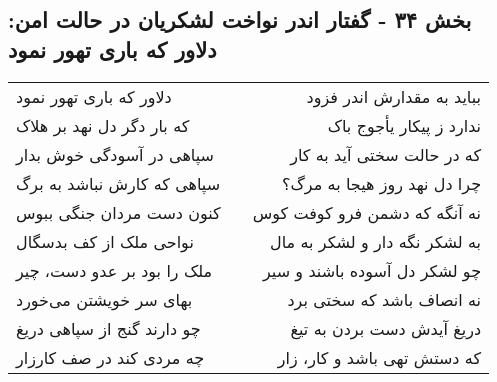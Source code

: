 \begin{center}
\section*{بخش ۳۴ - گفتار اندر نواخت لشکریان در حالت امن: دلاور که باری تهور نمود}
\label{sec:034}
\begin{longtable}{l p{0.5cm} r}
دلاور که باری تهور نمود
&&
بباید به مقدارش اندر فزود
\\
که بار دگر دل نهد بر هلاک
&&
ندارد ز پیکار یأجوج باک
\\
سپاهی در آسودگی خوش بدار
&&
که در حالت سختی آید به کار
\\
سپاهی که کارش نباشد به برگ
&&
چرا دل نهد روز هیجا به مرگ؟
\\
کنون دست مردان جنگی ببوس
&&
نه آنگه که دشمن فرو کوفت کوس
\\
نواحی ملک از کف بدسگال
&&
به لشکر نگه دار و لشکر به مال
\\
ملک را بود بر عدو دست، چیر
&&
چو لشکر دل آسوده باشند و سیر
\\
بهای سر خویشتن می‌خورد
&&
نه انصاف باشد که سختی برد
\\
چو دارند گنج از سپاهی دریغ
&&
دریغ آیدش دست بردن به تیغ
\\
چه مردی کند در صف کارزار
&&
که دستش تهی باشد و کار، زار
\\
\end{longtable}
\end{center}
